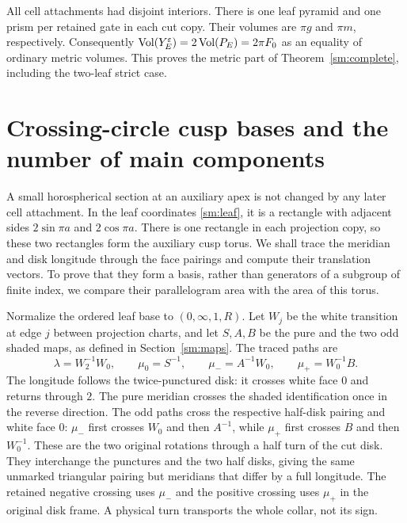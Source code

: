 All cell attachments had disjoint interiors. There is one leaf
pyramid and one prism per retained gate in each cut copy. Their
volumes are $\pi g$ and $\pi m$, respectively. Consequently
$\operatorname{Vol}(Y_E^\varepsilon)=2\operatorname{Vol}(P_E)=2\pi F_0$ as an equality of ordinary
metric volumes. This proves the metric part of
Theorem~\ref{sm:complete}, including the two-leaf strict case.

\section{Crossing-circle cusp bases and the number of main components}
\label{sm:collar}

A small horospherical section at an auxiliary apex is not changed by
any later cell attachment. In the leaf coordinates \eqref{sm:leaf},
it is a rectangle with adjacent sides $2\sin\pi a$ and
$2\cos\pi a$. There is one rectangle in each projection copy, so
these two rectangles form the auxiliary cusp torus.
We shall trace the meridian and disk longitude through the face
pairings and compute their translation vectors. To prove that they
form a basis, rather than generators of a subgroup of finite index,
we compare their parallelogram area with the area of this torus.

Normalize the ordered leaf base to $(0,\infty,1,R)$.
Let $W_j$ be the white transition at edge $j$ between projection
charts, and let $S,A,B$ be the pure and the two odd shaded maps,
as defined in Section~\ref{sm:maps}. The traced paths are
\begin{equation}\label{sm:peripheral-words}
 \lambda=W_2^{-1}W_0,\qquad
 \mu_0=S^{-1},\qquad
 \mu_-=A^{-1}W_0,\qquad
 \mu_+=W_0^{-1}B.
\end{equation}
The longitude follows the twice-punctured disk: it crosses white
face $0$ and returns through $2$.
The pure meridian crosses the shaded identification once in the
reverse direction. The odd paths cross the respective half-disk
pairing and white face $0$: $\mu_-$ first crosses $W_0$ and then
$A^{-1}$, while $\mu_+$ first crosses $B$ and then $W_0^{-1}$.
These are the two original rotations through a half turn of the
cut disk. They interchange the punctures and the two half disks,
giving the same unmarked triangular pairing but meridians that
differ by a full longitude. The retained negative crossing uses
$\mu_-$ and the positive crossing uses $\mu_+$ in the original
disk frame. A physical turn transports the whole collar, not its sign.

